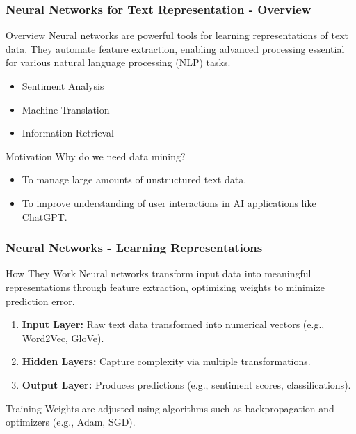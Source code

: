 \documentclass[aspectratio=169]{beamer}
\begin{document}
\begin{frame}[fragile]
    \frametitle{Neural Networks for Text Representation - Overview}
    \begin{block}{Overview}
        Neural networks are powerful tools for learning representations of text data. 
        They automate feature extraction, enabling advanced processing essential for various natural language processing (NLP) tasks.
    \end{block}
    \begin{itemize}
        \item Sentiment Analysis
        \item Machine Translation
        \item Information Retrieval
    \end{itemize}
    \begin{block}{Motivation}
        Why do we need data mining?
        \begin{itemize}
            \item To manage large amounts of unstructured text data.
            \item To improve understanding of user interactions in AI applications like ChatGPT.
        \end{itemize}
    \end{block}
\end{frame}

\begin{frame}[fragile]
    \frametitle{Neural Networks - Learning Representations}
    \begin{block}{How They Work}
        Neural networks transform input data into meaningful representations through feature extraction, optimizing weights to minimize prediction error.
    \end{block}
    \begin{enumerate}
        \item \textbf{Input Layer:} 
          Raw text data transformed into numerical vectors (e.g., Word2Vec, GloVe).
        \item \textbf{Hidden Layers:} 
          Capture complexity via multiple transformations.
        \item \textbf{Output Layer:} 
          Produces predictions (e.g., sentiment scores, classifications).
    \end{enumerate}

    \begin{block}{Training}
        Weights are adjusted using algorithms such as backpropagation and optimizers (e.g., Adam, SGD).
    \end{block}
\end{frame}
\end{document}
